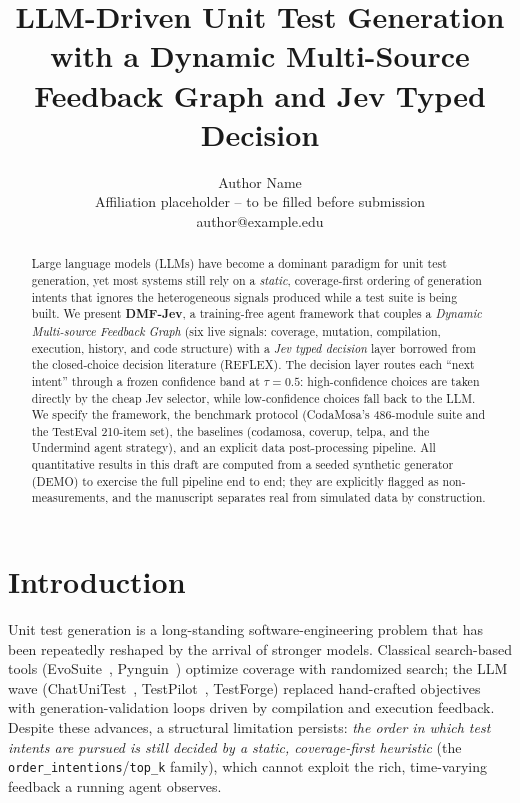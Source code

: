 \documentclass[11pt]{article}
\title{LLM-Driven Unit Test Generation with a Dynamic Multi-Source Feedback Graph and Jev Typed Decision}
\author{Author Name \\
Affiliation placeholder -- to be filled before submission \\
author@example.edu}
\date{}
\begin{document}
\maketitle

\begin{abstract}
Large language models (LLMs) have become a dominant paradigm for unit test generation, yet most systems still rely on a \emph{static}, coverage-first ordering of generation intents that ignores the heterogeneous signals produced while a test suite is being built. We present \textbf{DMF-Jev}, a training-free agent framework that couples a \emph{Dynamic Multi-source Feedback Graph} (six live signals: coverage, mutation, compilation, execution, history, and code structure) with a \emph{Jev typed decision} layer borrowed from the closed-choice decision literature (REFLEX). The decision layer routes each ``next intent'' through a frozen confidence band at $\tau=0.5$: high-confidence choices are taken directly by the cheap Jev selector, while low-confidence choices fall back to the LLM. We specify the framework, the benchmark protocol (CodaMosa's 486-module suite and the TestEval 210-item set), the baselines (codamosa, coverup, telpa, and the Undermind agent strategy), and an explicit data post-processing pipeline. All quantitative results in this draft are computed from a \textcolor{warn}{seeded synthetic generator (DEMO)} to exercise the full pipeline end to end; they are explicitly flagged as non-measurements, and the manuscript separates real from simulated data by construction.
\end{abstract}

\section{Introduction}
Unit test generation is a long-standing software-engineering problem that has been repeatedly reshaped by the arrival of stronger models. Classical search-based tools (EvoSuite~\cite{evosuite}, Pynguin~\cite{pynguin}) optimize coverage with randomized search; the LLM wave (ChatUniTest~\cite{chatunitest}, TestPilot~\cite{testpilot}, TestForge) replaced hand-crafted objectives with generation-validation loops driven by compilation and execution feedback. Despite these advances, a structural limitation persists: \emph{the order in which test intents are pursued is still decided by a static, coverage-first heuristic} (the \texttt{order\_intentions}/\texttt{top\_k} family), which cannot exploit the rich, time-varying feedback a running agent observes.
\end{document}
